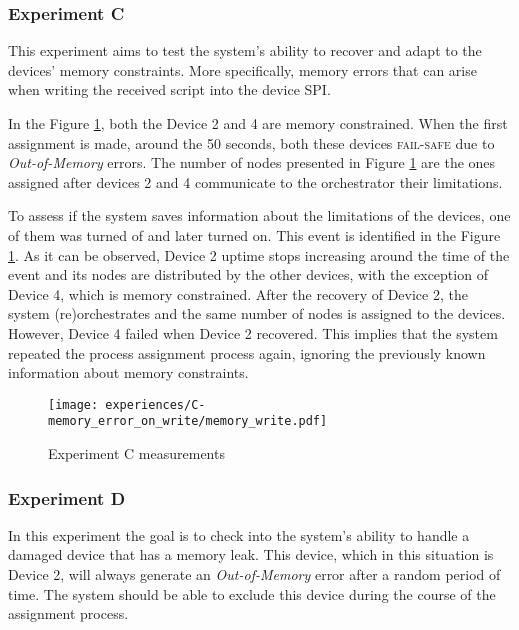 
\subsubsection{Experiment C}

This experiment aims to test the system's ability to recover and adapt to the devices' memory constraints. More specifically, memory errors that can arise when writing the received script into the device SPI.

In the Figure \ref{fig:experiment_c_graph}, both the Device 2 and 4 are memory constrained. When the first assignment is made, around the 50 seconds, both these devices \textsc{fail-safe} due to \textit{Out-of-Memory} errors. The number of nodes presented in Figure \ref{fig:experiment_c_graph} are the ones assigned after devices 2 and 4 communicate to the orchestrator their limitations. 

To assess if the system saves information about the limitations of the devices, one of them was turned of and later turned on. This event is identified in the Figure \ref{fig:experiment_c_graph}. As it can be observed, Device 2 uptime stops increasing around the time of the event and its nodes are distributed by the other devices, with the exception of Device 4, which is memory constrained. 
After the recovery of Device 2, the system (re)orchestrates and the same number of nodes is assigned to the devices. However, Device 4 failed when Device 2 recovered. This implies that the system repeated the process assignment process again, ignoring the previously known information about memory constraints.

\begin{figure}[h]
\centering
\texttt{[image: experiences/C-memory\_error\_on\_write/memory\_write.pdf]}
\caption[Experiment C measurements]{Experiment C measurements}\label{fig:experiment_c_graph}
\end{figure}


\subsubsection{Experiment D}

In this experiment the goal is to check into the system's ability to handle a damaged device that has a memory leak. This device, which in this situation is Device 2, will always generate an \textit{Out-of-Memory} error after a random period of time. The system should be able to exclude this device during the course of the assignment process.

